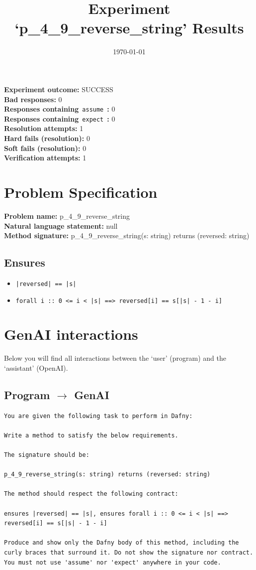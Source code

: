 \documentclass{article}
\begin{document}
\title{Experiment `p\_4\_9\_reverse\_string' Results}
\author{\today}
\date{}
\maketitle
\textbf{Experiment outcome: }SUCCESS
\\\textbf{Bad responses: }0
\\\textbf{Responses containing}~\texttt{assume}~\textbf{: }0
\\\textbf{Responses containing}~\texttt{expect}~\textbf{: }0
\\\textbf{Resolution attempts: }1
\\\textbf{Hard fails (resolution): }0
\\\textbf{Soft fails (resolution): }0
\\\textbf{Verification attempts: }1
\section*{Problem Specification}
\textbf{Problem name: }p\_4\_9\_reverse\_string
\\\textbf{Natural language statement: }null
\\\textbf{Method signature: }p\_4\_9\_reverse\_string(s: string) returns (reversed: string)
\subsection*{Ensures}
\begin{itemize}
\item \texttt{|reversed| == |s|}
\item \texttt{forall i :: 0 <= i < |s| ==> reversed[i] == s[|s| - 1 - i]}
\end{itemize}
\clearpage
\section*{GenAI interactions}
Below you will find all interactions between the `user' (program) and the `assistant' (OpenAI).
\subsection*{Program $\rightarrow$ GenAI}
\begin{lstlisting}
You are given the following task to perform in Dafny:

Write a method to satisfy the below requirements.

The signature should be:

p_4_9_reverse_string(s: string) returns (reversed: string)

The method should respect the following contract:

ensures |reversed| == |s|, ensures forall i :: 0 <= i < |s| ==> reversed[i] == s[|s| - 1 - i]

Produce and show only the Dafny body of this method, including the curly braces that surround it. Do not show the signature nor contract. You must not use 'assume' nor 'expect' anywhere in your code.
\end{lstlisting}
\end{document}
